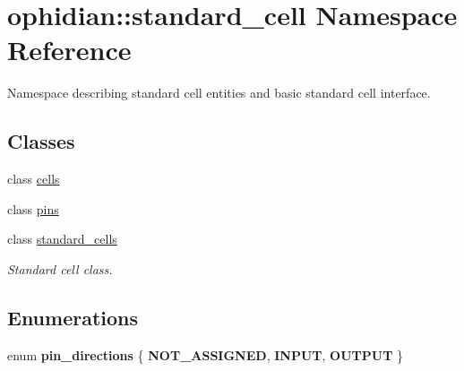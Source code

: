 \hypertarget{namespaceophidian_1_1standard__cell}{\section{ophidian\-:\-:standard\-\_\-cell Namespace Reference}
\label{namespaceophidian_1_1standard__cell}
}


Namespace describing standard cell entities and basic standard cell interface.  


\subsection*{Classes}
\begin{DoxyCompactItemize}
\item 
class \hyperlink{classophidian_1_1standard__cell_1_1cells}{cells}
\item 
class \hyperlink{classophidian_1_1standard__cell_1_1pins}{pins}
\item 
class \hyperlink{classophidian_1_1standard__cell_1_1standard__cells}{standard\-\_\-cells}
\begin{DoxyCompactList}\small\item\em Standard cell class. \end{DoxyCompactList}\end{DoxyCompactItemize}
\subsection*{Enumerations}
\begin{DoxyCompactItemize}
\item 
enum {\bfseries pin\-\_\-directions} \{ {\bfseries N\-O\-T\-\_\-\-A\-S\-S\-I\-G\-N\-E\-D}, 
{\bfseries I\-N\-P\-U\-T}, 
{\bfseries O\-U\-T\-P\-U\-T}
 \}
\end{DoxyCompactItemize}
